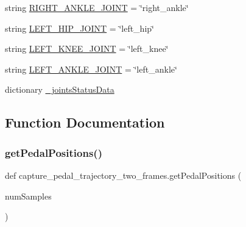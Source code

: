 \begin{DoxyCompactItemize}
string \mbox{\hyperlink{namespacecapture__pedal__trajectory__two__frames_a1e3e26ced6e2c375804db59e81ae7cb8}{R\+I\+G\+H\+T\+\_\+\+A\+N\+K\+L\+E\+\_\+\+J\+O\+I\+NT}} = \char`\"{}right\+\_\+ankle\char`\"{}
\item 
string \mbox{\hyperlink{namespacecapture__pedal__trajectory__two__frames_a5867d9ecafb3b82f3fcf92c822503c75}{L\+E\+F\+T\+\_\+\+H\+I\+P\+\_\+\+J\+O\+I\+NT}} = \char`\"{}left\+\_\+hip\char`\"{}
\item 
string \mbox{\hyperlink{namespacecapture__pedal__trajectory__two__frames_ab82c028ebcecd4fe8a1f21aba4b48a4b}{L\+E\+F\+T\+\_\+\+K\+N\+E\+E\+\_\+\+J\+O\+I\+NT}} = \char`\"{}left\+\_\+knee\char`\"{}
\item 
string \mbox{\hyperlink{namespacecapture__pedal__trajectory__two__frames_af110c842ea91703f34db75c23b373aa0}{L\+E\+F\+T\+\_\+\+A\+N\+K\+L\+E\+\_\+\+J\+O\+I\+NT}} = \char`\"{}left\+\_\+ankle\char`\"{}
\item 
dictionary \mbox{\hyperlink{namespacecapture__pedal__trajectory__two__frames_a14062e23f4c4b665cd41f9bc5e0b9700}{\+\_\+joints\+Status\+Data}}
\end{DoxyCompactItemize}


\subsection{Function Documentation}
\mbox{\label{namespacecapture__pedal__trajectory__two__frames_a73a2a38c755efa1febad326d592bc146}} 
\subsubsection{\texorpdfstring{getPedalPositions()}{getPedalPositions()}}
{\footnotesize\ttfamily def capture\+\_\+pedal\+\_\+trajectory\+\_\+two\+\_\+frames.\+get\+Pedal\+Positions (\begin{DoxyParamCaption}\item[{}]{num\+Samples }\end{DoxyParamCaption})}

\mbox{\label{namespacecapture__pedal__trajectory__two__frames_ab05bc93a4f072761742af7a715c0dc6a}} 
